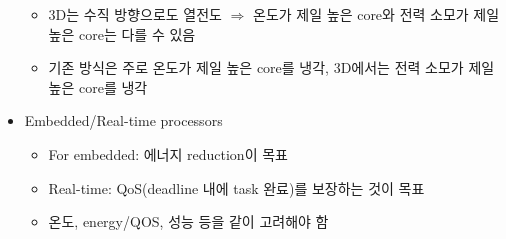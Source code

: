 \begin{itemize}
\begin{itemize}
        \item 3D는 수직 방향으로도 열전도 $\Rightarrow$ 온도가 제일 높은 core와 전력 소모가 제일 높은 core는 다를 수 있음
        \item 기존 방식은 주로 온도가 제일 높은 core를 냉각, 3D에서는 전력 소모가 제일 높은 core를 냉각
    \end{itemize}
    \item Embedded/Real-time processors
    \begin{itemize}
        \item For embedded: 에너지 reduction이 목표
        \item Real-time: QoS(deadline 내에 task 완료)를 보장하는 것이 목표
        \item 온도, energy/QOS, 성능 등을 같이 고려해야 함
    \end{itemize}
\end{itemize}

